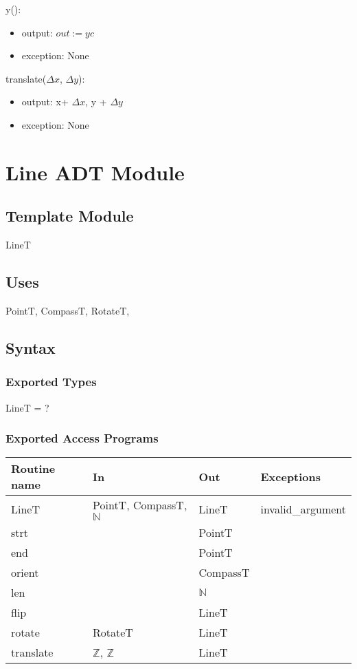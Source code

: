 \documentclass[12pt]{article}
\begin{document}
\noindent y():
\begin{itemize}
\item output: $out := yc$
\item exception: None
\end{itemize}

\noindent translate($\Delta x$, $\Delta y$):
\begin{itemize}
\item output: x+ $\Delta x$, y + $\Delta y$
\item exception: None
\end{itemize}

\newpage

\section* {Line ADT Module}

\subsection*{Template Module}

LineT

\subsection* {Uses}

PointT, CompassT, RotateT, 

\subsection* {Syntax}

\subsubsection* {Exported Types}

LineT = ?

\subsubsection* {Exported Access Programs}

\begin{tabular}{| l | l | l | l |}
\hline
\textbf{Routine name} & \textbf{In} & \textbf{Out} & \textbf{Exceptions}\\
\hline
LineT & PointT, CompassT, $\mathbb{N}$ & LineT & invalid\_argument\\
\hline
strt & ~ & PointT & ~\\
\hline
end & ~ & PointT & ~\\
\hline
orient & ~ & CompassT & ~\\
\hline
 len & ~ & $\mathbb{N}$ & ~\\
\hline
flip & ~ & LineT & ~\\
\hline
rotate & RotateT & LineT & ~\\
\hline
translate & $\mathbb{Z}$, $\mathbb{Z}$ & LineT  & ~\\
\hline
\end{tabular}
\end{document}

